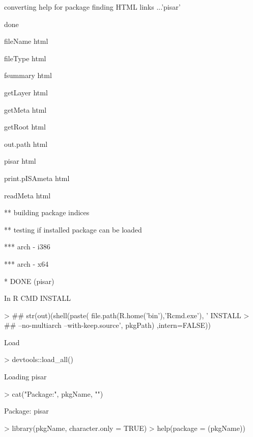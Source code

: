 \documentclass[a4paper,12pt]{article}\usepackage[]{graphicx}\usepackage[]{color}
\begin{document}
\begin{Schunk}
\begin{Soutput}
  converting help for package     finding HTML links ...'pisar'

 done

    fileName                                html  

    fileType                                html  

    fsummary                                html  

    getLayer                                html  

    getMeta                                 html  

    getRoot                                 html  

    out.path                                html  

    pisar                                   html  

    print.pISAmeta                          html  

    readMeta                                html  

** building package indices

** testing if installed package can be loaded

*** arch - i386

*** arch - x64

* DONE (pisar)

In R CMD INSTALL

\end{Soutput}
\begin{Sinput}
> ## str(out)(shell(paste( file.path(R.home('bin'),'Rcmd.exe'), ' INSTALL
> ## --no-multiarch --with-keep.source', pkgPath) ,intern=FALSE))
\end{Sinput}
\end{Schunk}

Load
\begin{Schunk}
\begin{Sinput}
> devtools::load_all()
\end{Sinput}
\begin{Soutput}
Loading pisar
\end{Soutput}
\begin{Sinput}
> cat("Package:", pkgName, "\n")
\end{Sinput}
\begin{Soutput}
Package: pisar 
\end{Soutput}
\begin{Sinput}
> library(pkgName, character.only = TRUE)
> help(package = (pkgName))
\end{Sinput}
\end{Schunk}
\end{document}
